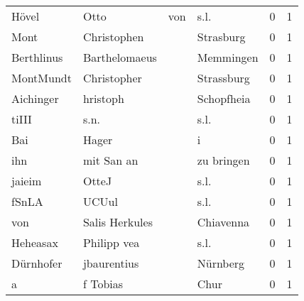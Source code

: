 \begin{tabular}{llllrr}
                    Hövel &                               Otto &         von &                                        s.l. &          0 &         1 \\
                     Mont &                        Christophen &             &                                   Strasburg &          0 &         1 \\
               Berthlinus &                      Barthelomaeus &             &                                   Memmingen &          0 &         1 \\
                MontMundt &                        Christopher &             &                                  Strassburg &          0 &         1 \\
                Aichinger &                           hristoph &             &                                  Schopfheia &          0 &         1 \\
                    tiIII &                               s.n. &             &                                        s.l. &          0 &         1 \\
                      Bai &                              Hager &             &                                           i &          0 &         1 \\
                      ihn &                         mit San an &             &                                  zu bringen &          0 &         1 \\
                   jaieim &                              OtteJ &             &                                        s.l. &          0 &         1 \\
                    fSnLA &                              UCUul &             &                                        s.l. &          0 &         1 \\
                      von &                     Salis Herkules &             &                                   Chiavenna &          0 &         1 \\
                 Heheasax &                        Philipp vea &             &                                        s.l. &          0 &         1 \\
                Dürnhofer &                        jbaurentius &             &                                    Nürnberg &          0 &         1 \\
                        a &                           f Tobias &             &                                        Chur &          0 &         1 \\

\end{tabular}
